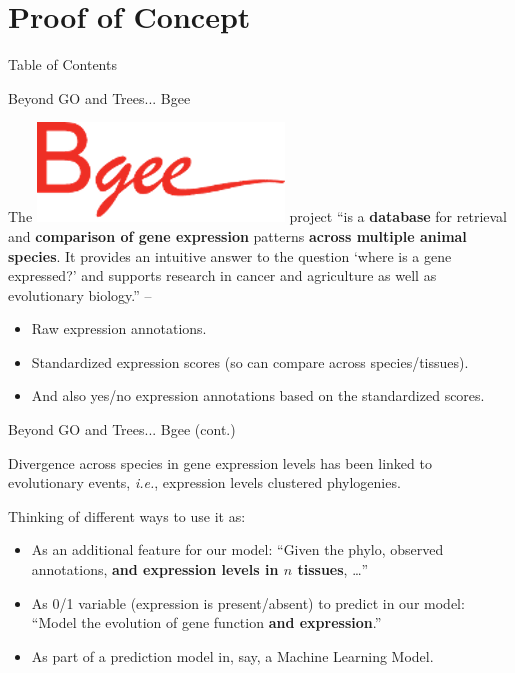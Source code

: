 \documentclass[10pt,aspectratio=169]{beamer}
\newcounter{frame}[frame]
\newcommand{\toc}[0]{\begin{frame}{Table of Contents}
    \tableofcontents[current]
\end{frame}}
\begin{document}
\section{Proof of Concept}\toc{}

\begin{frame}{Beyond GO and Trees... Bgee}


The \includegraphics[width=.1\linewidth]{fig/bgee_logo.png} project ``is a \textbf{database} for retrieval and \textbf{comparison of gene expression} patterns \textbf{across multiple animal species}. It provides an intuitive answer to the question `where is a gene expressed?' and supports research in cancer and agriculture as well as evolutionary biology.'' -- \textcite{bastianBgeeSuiteIntegrated2021}

\begin{itemize}
    \item Raw expression annotations.
    \item Standardized expression scores (so can compare across species/tissues).
    \item And also yes/no expression annotations based on the standardized scores.
\end{itemize}

\end{frame}

\begin{frame}{Beyond GO and Trees... Bgee (cont.)}

Divergence across species in gene expression levels has been linked to evolutionary events\autocite{nabholzHighLevelsGene2013, hodgins-davisEvolvingGeneExpression2009}, \textit{i.e.}, expression levels clustered phylogenies.\\\bigskip

Thinking of different ways to use it as:\\\bigskip

\begin{itemize}
    \item As an additional feature for our model: ``Given the phylo, observed annotations, \textbf{and expression levels in $n$ tissues}, \dots''
    \item As 0/1 variable (expression is present/absent) to predict in our model: ``Model the evolution of gene function \textbf{and expression}.''
    \item As part of a prediction model in, say, a Machine Learning Model.
\end{itemize}

    
\end{frame}
\end{document}
